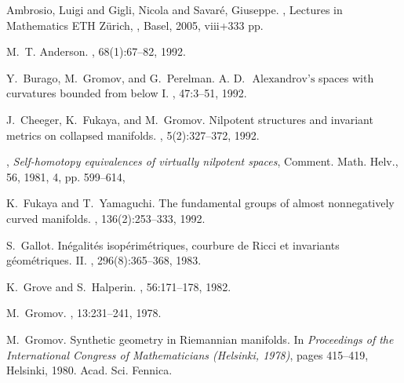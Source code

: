 \documentclass{amsart}
\begin{document}
\begin{thebibliography}{HMR75}

  {Ambrosio, Luigi and Gigli, Nicola and Savar{\'e}, Giuseppe}.
, \newblock
{Lectures in Mathematics ETH Z\"urich}, ,
 {Basel},
 {2005},
 {viii+333} pp.

M.~T. Anderson.
, 68(1):67--82, 1992.

Y.~Burago, M.~Gromov, and G.~Perelman.
\newblock $\text{A.~D. ~Alexandrov's}$ spaces with curvatures bounded from
  below \rm{I}.
, 47:3--51, 1992.

J.~Cheeger, K.~Fukaya, and M.~Gromov.
\newblock Nilpotent structures and invariant metrics on collapsed manifolds.
, 5(2):327--372, 1992.

,
 \textit{Self-homotopy equivalences of virtually nilpotent spaces},
{Comment. Math. Helv.},
{56},
{1981},
{4},
pp. {599--614},

K.~Fukaya and T.~Yamaguchi.
\newblock The fundamental groups of almost nonnegatively curved manifolds.
, 136(2):253--333, 1992.

S.~Gallot.
\newblock In\'egalit\'es isop\'erim\'etriques, courbure de {R}icci et
  invariants g\'eom\'etriques. {II}.
, 296(8):365--368, 1983.


K.~Grove and S.~Halperin.
, 56:171--178, 1982.




M.~Gromov.
, 13:231--241, 1978.

M.~Gromov.
\newblock Synthetic geometry in {R}iemannian manifolds.
\newblock In {\em Proceedings of the International Congress of Mathematicians
  (Helsinki, 1978)}, pages 415--419, Helsinki, 1980. Acad. Sci. Fennica.


\end{thebibliography}
\end{document}
